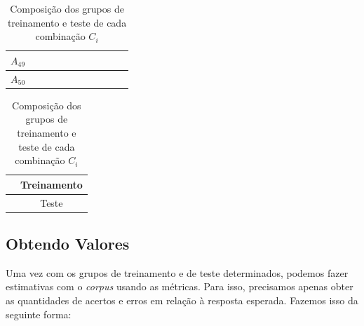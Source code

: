 \documentclass[11pt]{report}
\begin{document}
\begin{table}[h!]
\begin{tabular}{| c | c | c | c | c | c | c | c | c | c | c |}
    \small{$A_{49}$} & \cellcolor{train} & \cellcolor{train} & \cellcolor{train} & \cellcolor{train} & \cellcolor{train} & \cellcolor{train} & \cellcolor{test}  & \cellcolor{train} & \cellcolor{train} &  \cellcolor{train} \\ \hline
    \small{$A_{50}$} & \cellcolor{train} & \cellcolor{train} & \cellcolor{train} & \cellcolor{train} & \cellcolor{train} & \cellcolor{train} & \cellcolor{train} & \cellcolor{train} & \cellcolor{train} &  \cellcolor{train} \\ \hline
  \end{tabular}
  \begin{tabular}{| c | c |}
    \hline
    \cellcolor{train} & Treinamento \\ \hline
    \cellcolor{test} & Teste \\ \hline
  \end{tabular}
  \caption{Composição dos grupos de treinamento e teste de cada combinação $C_i$}
\end{table}

\subsection{Obtendo Valores}

\indent\indent Uma vez com os grupos de treinamento e de teste determinados, podemos fazer estimativas com o \textit{corpus} usando as métricas. Para isso, precisamos
apenas obter as quantidades de acertos e erros em relação à resposta esperada. Fazemos isso da seguinte forma:
\end{document}
